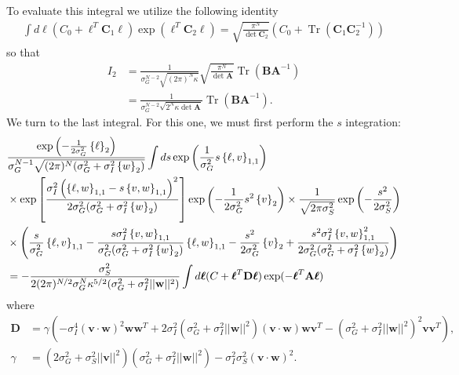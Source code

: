 \documentclass[11pt]{article}
\DeclareMathOperator{\Tr}{Tr}
\begin{document}
To evaluate this integral we utilize the following identity
\begin{align}
\int d\boldsymbol{\ell} \left(C_0 +\boldsymbol{\ell}^T \mathbf{C}_1 \boldsymbol{\ell}\right)\exp\left(\boldsymbol{\ell}^T \mathbf{C}_2 \boldsymbol{\ell}\right) = \sqrt{\frac{\pi^N}{\det \mathbf{C}_2}}\left(C_0 + \Tr\left(\mathbf{C}_1\mathbf{C}_2^{-1}\right)\right)
\end{align}
so that
\begin{align}
	I_2 &= \frac{1}{\sigma_G^{N-2}\sqrt{(2\pi)^N \kappa}} \sqrt{\frac{\pi^N}{\det \mathbf{A}}} \Tr(\mathbf{B} \mathbf{A}^{-1}) \\
	&= \frac{1}{\sigma_G^{N-2} \sqrt{2^N \kappa \det \mathbf{A}}}\Tr(\mathbf{B} \mathbf{A}^{-1}).
\end{align}
We turn to the last integral. For this one, we must first perform the $s$ integration: 
\begin{align}
	&\frac{\exp\left(-\frac{1}{2\sigma_G^2}\left\{\ell \right\}_2\right)}{\sigma_G^{N-1}\sqrt{(2\pi)^N(\sigma_G^2 + \sigma_I^2 \left\{w\right\}_2)}} \int ds \exp\left(\frac{1}{\sigma_G^2} s\left\{\ell, v\right\}_{1,1}\right) \notag \\
	&\times \exp\left[\frac{\sigma_I^2\left(\left\{\ell, w\right\}_{1,1} - s \left\{v,w\right\}_{1,1}\right)^2}{2\sigma_G^2 (\sigma_G^2 + \sigma_I^2 \left\{w\right\}_2)}\right]\exp\left(-\frac{1}{2\sigma_G^2}s^2 \left\{v\right\}_2\right)\times \frac{1}{\sqrt{2\pi \sigma_S^2}} \exp\left(-\frac{s^2}{2\sigma_S^2}\right) \notag \\
	&\times \left(\frac{s}{\sigma_G^2} \left\{\ell, v\right\}_{1,1} - \frac{s \sigma_I^2 \left\{v,w\right\}_{1,1}}{\sigma_G^2 (\sigma_G^2 + \sigma_I^2 \left\{w\right\}_2)}\left\{\ell, w\right\}_{1,1} - \frac{s^2}{2\sigma_G^2} \left\{v\right\}_2   + \frac{s^2 \sigma_I^2 \left\{v,w\right\}_{1,1}^2}{2\sigma_G^2 (\sigma_G^2 + \sigma_I^2 \left\{w\right\}_2)}\right) \\
	&= -\frac{\sigma_S^2}{2(2\pi)^{N/2} \sigma_G^N \kappa^{5/2} (\sigma_G^2 + \sigma_I^2 ||\mathbf{w}||^2)}\int d\boldsymbol{\ell}(C + \boldsymbol{\ell}^T \mathbf{D} \boldsymbol{\ell})\exp(-\boldsymbol{\ell}^T \mathbf{A} \boldsymbol{\ell})
\end{align}
where
\begin{align}
	\mathbf{D} &= \gamma \left(-\sigma_I^4 (\mathbf{v}\cdot\mathbf{w})^2\mathbf{ww}^T+ 2\sigma_I^2 (\sigma_G^2 + \sigma_I^2 ||\mathbf{w}||^2)(\mathbf{v} \cdot \mathbf{w})\mathbf{wv}^T -(\sigma_G^2 + \sigma_I^2 ||\mathbf{w}||^2)^2 \mathbf{vv}^T\right),\\
	\gamma &= (2\sigma_G^2 + \sigma_S^2 ||\mathbf{v}||^2)(\sigma_G^2 + \sigma_I^2 ||\mathbf{w}||^2) - \sigma_I^2 \sigma_S^2 (\mathbf{v}\cdot \mathbf{w})^2.
\end{align}
\end{document}
